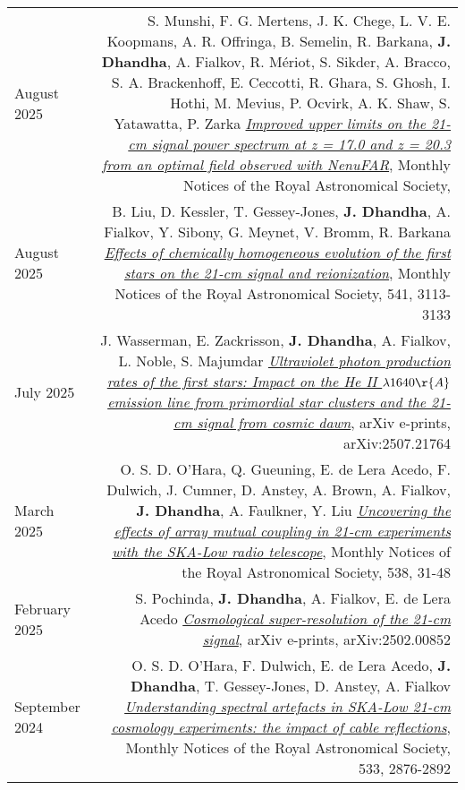 \documentclass{article}
\begin{document}
\begin{longtable}{L!{\vrule}R}
    August 2025 &
    S. Munshi, F. G. Mertens, J. K. Chege, L. V. E. Koopmans, A. R. Offringa, B. Semelin, R. Barkana, \textbf{J. Dhandha}, A. Fialkov, R. M\'eriot, S. Sikder, A. Bracco, S. A. Brackenhoff, E. Ceccotti, R. Ghara, S. Ghosh, I. Hothi, M. Mevius, P. Ocvirk, A. K. Shaw, S. Yatawatta, P. Zarka
    \href{https://ui.adsabs.harvard.edu/abs/2025MNRAS.tmp.1333M}{\textit{Improved upper limits on the 21-cm signal power spectrum at z = 17.0 and z = 20.3 from an optimal field observed with NenuFAR}},
    Monthly Notices of the Royal Astronomical Society,  \\

    August 2025 &
    B. Liu, D. Kessler, T. Gessey-Jones, \textbf{J. Dhandha}, A. Fialkov, Y. Sibony, G. Meynet, V. Bromm, R. Barkana
    \href{https://ui.adsabs.harvard.edu/abs/2025MNRAS.541.3113L}{\textit{Effects of chemically homogeneous evolution of the first stars on the 21-cm signal and reionization}},
    Monthly Notices of the Royal Astronomical Society, 541, 3113-3133 \\

    July 2025 &
    J. Wasserman, E. Zackrisson, \textbf{J. Dhandha}, A. Fialkov, L. Noble, S. Majumdar
    \href{https://ui.adsabs.harvard.edu/abs/2025arXiv250721764W}{\textit{Ultraviolet photon production rates of the first stars: Impact on the He II $\lambda 1640 \r{A}$ emission line from primordial star clusters and the 21-cm signal from cosmic dawn}},
    arXiv e-prints, arXiv:2507.21764 \\

    March 2025 &
    O. S. D. O'Hara, Q. Gueuning, E. de Lera Acedo, F. Dulwich, J. Cumner, D. Anstey, A. Brown, A. Fialkov, \textbf{J. Dhandha}, A. Faulkner, Y. Liu
    \href{https://ui.adsabs.harvard.edu/abs/2025MNRAS.538...31O}{\textit{Uncovering the effects of array mutual coupling in 21-cm experiments with the SKA-Low radio telescope}},
    Monthly Notices of the Royal Astronomical Society, 538, 31-48 \\

    February 2025 &
    S. Pochinda, \textbf{J. Dhandha}, A. Fialkov, E. de Lera Acedo
    \href{https://ui.adsabs.harvard.edu/abs/2025arXiv250200852P}{\textit{Cosmological super-resolution of the 21-cm signal}},
    arXiv e-prints, arXiv:2502.00852 \\

    September 2024 &
    O. S. D. O'Hara, F. Dulwich, E. de Lera Acedo, \textbf{J. Dhandha}, T. Gessey-Jones, D. Anstey, A. Fialkov
    \href{https://ui.adsabs.harvard.edu/abs/2024MNRAS.533.2876O}{\textit{Understanding spectral artefacts in SKA-Low 21-cm cosmology experiments: the impact of cable reflections}},
    Monthly Notices of the Royal Astronomical Society, 533, 2876-2892 \\


\end{longtable}
\end{document}
